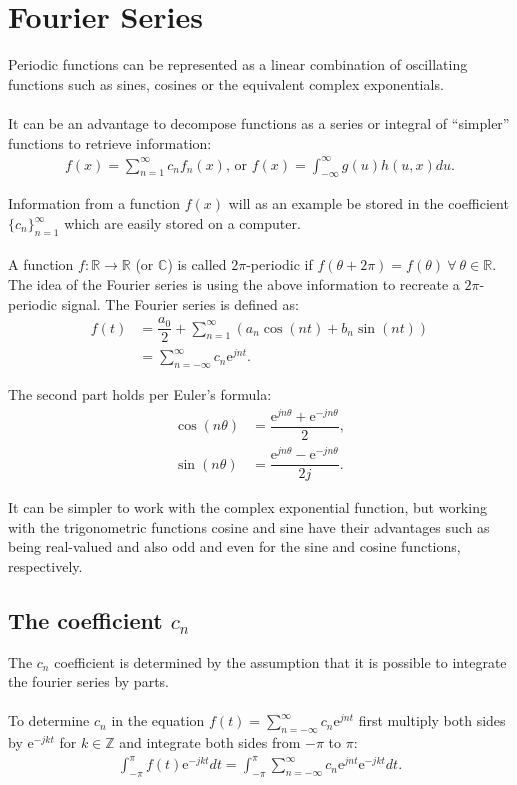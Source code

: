 \chapter{Fourier Series} \label{appA:Fourierseries}
Periodic functions can be represented as a linear combination of oscillating functions such as sines, cosines or the equivalent complex exponentials.
\\ \\
It can be an advantage to decompose functions as a series or integral of ``simpler'' functions to retrieve information:
\begin{align*}
f(x) = \sum_{n=1}^\infty c_n f_n(x)\text{, or } f(x)= \int_{-\infty}^\infty g(u) h(u,x) du.
\end{align*}

Information from a function $f(x)$ will as an example be stored in the coefficient $\{c_n\}_{n=1}^\infty$ which are easily stored on a computer.
\\ \\
A function $f: \mathbb{R} \to \mathbb{R}$ (or $\mathbb{C}$) is called $2\pi$-periodic if $f(\theta + 2\pi) = f(\theta) \ \forall \ \theta\in\mathbb{R}$. The idea of the Fourier series is using the above information to recreate a $2\pi$-periodic signal. The Fourier series is defined as:
\begin{align*}
f(t) &= \dfrac{a_0}{2} + \sum_{n=1}^\infty(a_n \cos(n t) + b_n \sin(n t))\\
&= \sum_{n=-\infty}^{\infty} c_n \text{e}^{j n t}.
\end{align*}

The second part holds per Euler's formula:
\begin{align*}
\cos(n\theta) &= \dfrac{\text{e}^{j n \theta} + \text{e}^{-j n \theta}}{2}, \\
\sin(n \theta) &= \dfrac{\text{e}^{jn\theta}-\text{e}^{-jn\theta}}{2j}.
\end{align*}

It can be simpler to work with the complex exponential function, but working with the trigonometric functions cosine and sine have their advantages such as being real-valued and also odd and even for the sine and cosine functions, respectively.

\section{The coefficient $c_n$}
The $c_n$ coefficient is determined by the assumption that it is possible to integrate the fourier series by parts.
\\ \\
To determine $c_n$ in the equation $f(t)= \sum_{n=-\infty}^{\infty} c_n \text{e}^{j n t}$ first multiply both sides by $\text{e}^{-j k t}$ for $k\in \mathbb{Z}$ and integrate both sides from $-\pi$ to $\pi$:
\begin{align} \label{eq:firststep_fouriercoefficient}
\int_{-\pi}^\pi f(t)\text{e}^{-j k t} dt = \int_{-\pi}^\pi \sum_{n=-\infty}^{\infty} c_n \text{e}^{j n t} \text{e}^{-j k t} dt.
\end{align}

